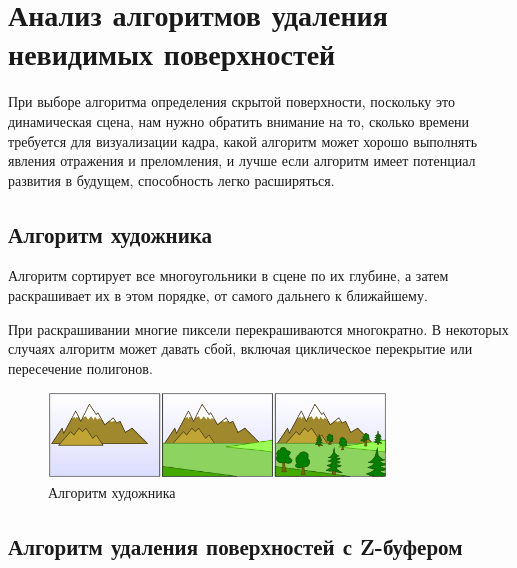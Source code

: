 \section{Анализ алгоритмов удаления невидимых поверхностей}

При выборе алгоритма определения скрытой поверхности, поскольку это динамическая сцена, нам нужно обратить внимание на то, сколько времени требуется для визуализации кадра, какой алгоритм может хорошо выполнять явления отражения и преломления, и лучше если алгоритм имеет потенциал развития в будущем, способность легко расширяться.



\subsection*{Алгоритм художника}

Алгоритм сортирует все многоугольники в сцене по их глубине, а затем раскрашивает их в этом порядке, от самого дальнего к ближайшему.

При раскрашивании многие пиксели перекрашиваются многократно.
В некоторых случаях алгоритм может давать сбой, включая циклическое перекрытие или пересечение полигонов.
\\
\begin{figure}[ht]
  \centering
  \includegraphics[width=0.8\textwidth]{img/painter.png}
  \caption{Алгоритм художника}
\end{figure}


\subsection*{Алгоритм удаления поверхностей с Z-буфером}



